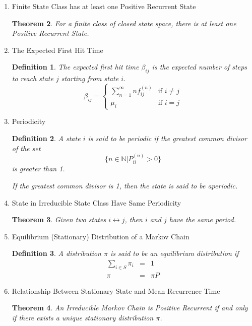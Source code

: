 \documentclass{article}
\newtheorem{definition}{Definition}[section]
\newtheorem{theorem}{Theorem}[section]
\begin{document}
\begin{enumerate}
\begin{theorem}
          $i$ is Null Recurrent if and only if $j$ is Null Recurrent.
        \end{theorem}
  \item Finite State Class has at least one Positive Recurrent State
        \begin{theorem}
          For a finite class of closed state space,
          there is at least one Positive Recurrent State.
        \end{theorem}
  \item The Expected First Hit Time
        \begin{definition}
          The expected first hit time $\beta_{ij}$ is
          the expected number of steps to reach state $j$
          starting from state $i$.
          \begin{equation}
            \beta_{ij} = \begin{cases}
              \sum_{n=1}^{\infty} n f_{ij}^{(n)} & \text{if } i \neq j \\
              \mu_{i}                            & \text{if } i = j
            \end{cases}
          \end{equation}
        \end{definition}
  \item Periodicity
        \begin{definition}
          A state $i$ is said to be periodic if
          the greatest common divisor of the set
          \begin{equation}
            \{n \in \mathbb{N} | P_{ii}^{(n)} > 0\}
          \end{equation}
          is greater than 1.

          If the greatest common divisor is 1,
          then the state is said to be aperiodic.
        \end{definition}
  \item State in Irreducible State Class Have Same Periodicity
        \begin{theorem}
          Given two states $i \leftrightarrow j$,
          then $i$ and $j$ have the same period.
        \end{theorem}
  \item Equilibrium (Stationary) Distribution of a Markov Chain
        \begin{definition}
          A distribution $\pi$ is said to be an equilibrium distribution
          if
          \begin{eqnarray}
            \sum_{i\in S} \pi_{i} &=& 1 \\
            \pi &=& \pi P
          \end{eqnarray}
        \end{definition}
  \item Relationship Between Stationary State and Mean Recurrence Time
        \begin{theorem}
          An Irreducible Markov Chain is Positive Recurrent if and only if
          there exists a unique stationary distribution $\pi$.


\end{theorem}
\end{enumerate}
\end{document}
